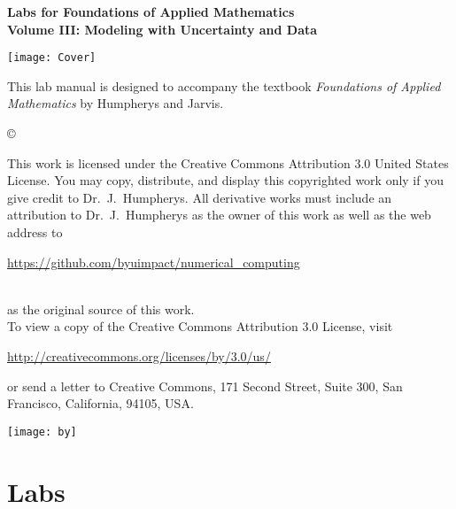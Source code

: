 \documentclass[nociteref]{SIAM-GH-book}
\begin{document}

\thispagestyle{empty} %

\begin{center}
{\huge \bf Labs for Foundations of Applied Mathematics} \\
\vspace{5mm}
{\Large \bf Volume III: Modeling with Uncertainty and Data}
\vspace{20mm}

\texttt{[image: Cover]}
\end{center}
\frontmatter



\begin{thepreface} %

This lab manual is designed to accompany the textbook \emph{Foundations of Applied Mathematics} by Humpherys and Jarvis.

\vfill
\copyright{This work is licensed under the Creative Commons Attribution 3.0 United States
License.  You may copy, distribute, and display this copyrighted work only if you give
credit to Dr.~J.~Humpherys. All derivative works must include an attribution to Dr.~J.~Humpherys as the owner of this work as well as the web address to
\\\centerline{\url{https://github.com/byuimpact/numerical_computing}}\\ as the original source of
this
work.\\To view a copy of the Creative Commons Attribution 3.0 License,
visit\\\centerline{\url{http://creativecommons.org/licenses/by/3.0/us/}} or send a letter to
Creative Commons, 171 Second Street, Suite 300, San Francisco, California, 94105, USA.}

\vfill
\centering\texttt{[image: by]}
\vfill
\end{thepreface}

\setcounter{tocdepth}{1}
\tableofcontents

\mainmatter



\part{Labs}
\end{document}
